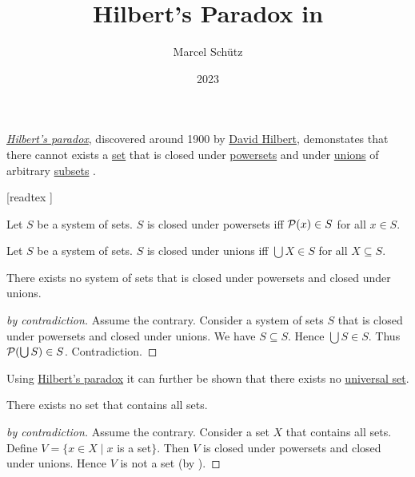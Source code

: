\documentclass[english]{article}
\begin{document}
\title{Hilbert's Paradox in \Naproche}
\author{Marcel Schütz}
\date{2023}
\maketitle

\noindent \href{https://en.wikipedia.org/wiki/Von_Neumann_universe#Hilbert's_paradox}{\emph{Hilbert's paradox}}, discovered around 1900 by \href{https://en.wikipedia.org/wiki/David_Hilbert}{David Hilbert}, demonstates that there cannot exists a \href{https://en.wikipedia.org/wiki/Set_(mathematics)}{set} that is closed under \href{https://en.wikipedia.org/wiki/Power_set}{powersets} and under \href{https://en.wikipedia.org/wiki/Union_(set_theory)}{unions} of arbitrary \href{https://en.wikipedia.org/wiki/Subset}{subsets} \cite{PeckhausKahl2002}.

\begin{forthel}
  [readtex ]

  \begin{definition*}
    Let $S$ be a system of sets.
    $S$ is closed under powersets iff $\mathcal{P}(x) \in S$ for all $x \in S$.
  \end{definition*}

  \begin{definition*}
    Let $S$ be a system of sets.
    $S$ is closed under unions iff $\bigcup X \in S$ for all $X \subseteq S$.
  \end{definition*}

  \begin{theorem*}\label{hilbert_paradox}
    There exists no system of sets that is closed under powersets and closed under unions.
  \end{theorem*}
  \begin{proof}[by contradiction]
    Assume the contrary.
    Consider a system of sets $S$ that is closed under powersets and closed under unions.
    We have $S \subseteq S$.
    Hence $\bigcup S \in S$.
    Thus $\mathcal{P}(\bigcup S) \in S$.
    Contradiction.
  \end{proof}
\end{forthel}

\noindent Using \href{https://en.wikipedia.org/wiki/Von_Neumann_universe#Hilbert's_paradox}{Hilbert's paradox} it can further be shown that there exists no \href{https://en.wikipedia.org/wiki/Universal_set}{universal set}.

\begin{forthel}
  \begin{corollary*}
    There exists no set that contains all sets.
  \end{corollary*}
  \begin{proof}[by contradiction]
    Assume the contrary.
    Consider a set $X$ that contains all sets.
    Define $V = \{ x \in X \mid x$ is a set$\}$.
    Then $V$ is closed under powersets and closed under unions.
    Hence $V$ is not a set (by ).
  \end{proof}
\end{forthel}

\printbibliography
\vfill
\doclicenseThis
\end{document}
